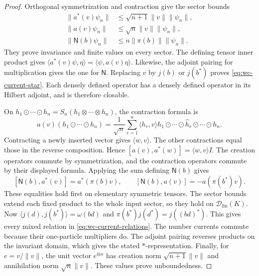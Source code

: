 \begin{proof}
Orthogonal symmetrization and contraction give the sector bounds
\begin{equation}
 \begin{aligned}
 \|a^*(v)\psi_n\|&\leq\sqrt{n+1}\|v\|\|\psi_n\|,\\
 \|a(v)\psi_n\|&\leq\sqrt n\|v\|\|\psi_n\|,\\
 \|\mathsf N(b)\psi_n\|&\leq n\|\pi(b)\|\|\psi_n\|.
 \end{aligned}
 \label{eq:wc-sector-bounds}
\end{equation}
They prove invariance and finite values on every sector.
The defining tensor inner product gives
$\langle a^*(v)\psi,\eta\rangle=\langle\psi,a(v)\eta\rangle$.
Likewise, the adjoint pairing for multiplication gives the one for
$\mathsf N$.  Replacing $v$ by $j(b)$ or $j(b^*)$ proves
\eqref{eq:wc-current-star}.
Each densely defined operator has a densely defined operator in its
Hilbert adjoint, and is therefore closable.

On $h_1\odot\cdots\odot h_n=S_n(h_1\otimes\cdots\otimes h_n)$,
the contraction formula is
\[
 a(v)(h_1\odot\cdots\odot h_n)
 =\frac1{\sqrt n}\sum_{r=1}^n\langle h_r,v\rangle
 h_1\odot\cdots\odot\widehat h_r\odot\cdots\odot h_n.
\]
Contracting a newly inserted vector gives $\langle w,v\rangle$.
The other contractions equal those in the reverse composition.
Hence $[a(v),a^*(w)]=\langle w,v\rangle I$.
The creation operators commute by symmetrization, and the contraction
operators commute by their displayed formula.
Applying the sum defining $\mathsf N(b)$ gives
\[
 [\mathsf N(b),a^*(v)]=a^*(\pi(b)v),\qquad
 [\mathsf N(b),a(v)]=-a(\pi(b^*)v).
\]
These equalities hold first on elementary symmetric tensors.
The sector bounds extend each fixed product to the whole input sector,
so they hold on $\mathcal D_{\mathrm{fin}}(K)$.
Now
$\langle j(d),j(b^*)\rangle=\omega(bd)$ and
$\pi(b^*)j(d^*)=j((bd)^*)$.
This gives every mixed relation in \eqref{eq:wc-current-relations}.
The number currents commute because their one-particle multipliers do.
The adjoint pairing reverses products on the invariant domain, which
gives the stated $*$-representation.
Finally, for $e=v/\|v\|$, the unit vector $e^{\otimes n}$ has creation
norm $\sqrt{n+1}\|v\|$ and annihilation norm $\sqrt n\|v\|$.
These values prove unboundedness.
\end{proof}

